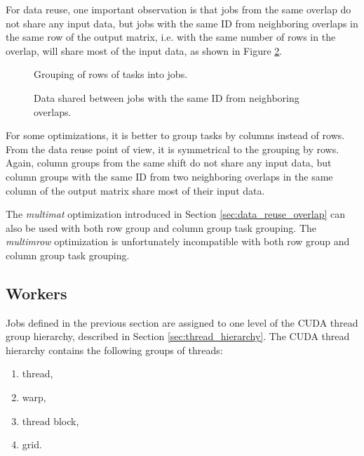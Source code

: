For data reuse, one important observation is that jobs from the same overlap do not share any input data, but jobs with the same ID from neighboring overlaps in the same row of the output matrix, i.e. with the same number of rows in the overlap, will share most of the input data, as shown in Figure \ref{fig:row_subset_data_reuse}.

\begin{figure}[ht]
	\centering
	\def\svgwidth{0.7\textwidth}
	
	\caption{Grouping of rows of tasks into jobs.}
	\label{fig:row_subset_tasks}
\end{figure}

\begin{figure}[ht]
	\centering
	\def\svgwidth{0.4\textwidth}
	\fontsize{8}{10}\selectfont
	
	\caption{Data shared between jobs with the same ID from neighboring overlaps.}
	\label{fig:row_subset_data_reuse}
\end{figure}

For some optimizations, it is better to group tasks by columns instead of rows. From the data reuse point of view, it is symmetrical to the grouping by rows. Again, column groups from the same shift do not share any input data, but column groups with the same ID from two neighboring overlaps in the same column of the output matrix share most of their input data.

The \textit{multimat} optimization introduced in Section \ref{sec:data_reuse_overlap} can also be used with both row group and column group task grouping. The \textit{multimrow} optimization is unfortunately incompatible with both row group and column group task grouping.

\subsection{Workers}

Jobs defined in the previous section are assigned to one level of the CUDA thread group hierarchy, described in Section \ref{sec:thread_hierarchy}. The CUDA thread hierarchy contains the following groups of threads:
\begin{enumerate}
	\item thread,
	\item warp,
	\item thread block,
	\item grid.
\end{enumerate}


